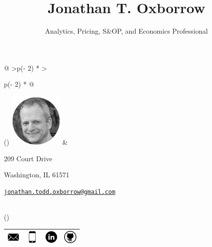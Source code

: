 \documentclass[
  letterpaper,
  DIV=11,
  numbers=noendperiod]{scrartcl}
\title{Jonathan T. Oxborrow}
\subtitle{Analytics, Pricing, S\&OP, and Economics Professional}
\author{}
\date{}
\begin{document}
\maketitle
\ifdefined\Shaded\renewenvironment{Shaded}{\begin{tcolorbox}[boxrule=0pt, frame hidden, enhanced, interior hidden, borderline west={3pt}{0pt}{shadecolor}, breakable, sharp corners]}{\end{tcolorbox}}\fi

\begin{longtable}[]{@{}
  >{\centering\arraybackslash}p{(\columnwidth - 2\tabcolsep) * }
  >{\raggedright\arraybackslash}p{(\columnwidth - 2\tabcolsep) * }@{}}
\toprule()
\endhead
\includegraphics[width=1.04167in,height=\textheight]{assets/avatar.png}
& \begin{minipage}[t]{\linewidth}\raggedright
209 Court Drive

Washington, IL 61571

\href{mailto:jonathan.todd.oxborrow@gmail.com}{\nolinkurl{jonathan.todd.oxborrow@gmail.com}}
\end{minipage} \\
\bottomrule()
\end{longtable}

\hypertarget{social-links}{}
\begin{longtable}[]{@{}
  >{\centering\arraybackslash}p{}
  >{\centering\arraybackslash}p{}
  >{\centering\arraybackslash}p{}
  >{\centering\arraybackslash}p{}@{}}
\toprule()
\endhead
\href{mailto:jonathan.todd.oxborrow@gmail.com}{\includegraphics[width=0.26042in,height=\textheight]{assets/envelope.png}}
&
\href{tel:309-822-2113}{\includegraphics[width=0.26042in,height=\textheight]{assets/cell-phone.png}}
&
\href{https://www.linkedin.com/in/joxborrow1}{\includegraphics[width=0.26042in,height=\textheight]{assets/linkedin-round.png}}
&
\href{http://github.com/joxborrow}{\includegraphics[width=0.26042in,height=\textheight]{assets/github-icon-logo-png-transparent.png}} \\
\bottomrule()
\end{longtable}
\end{document}
